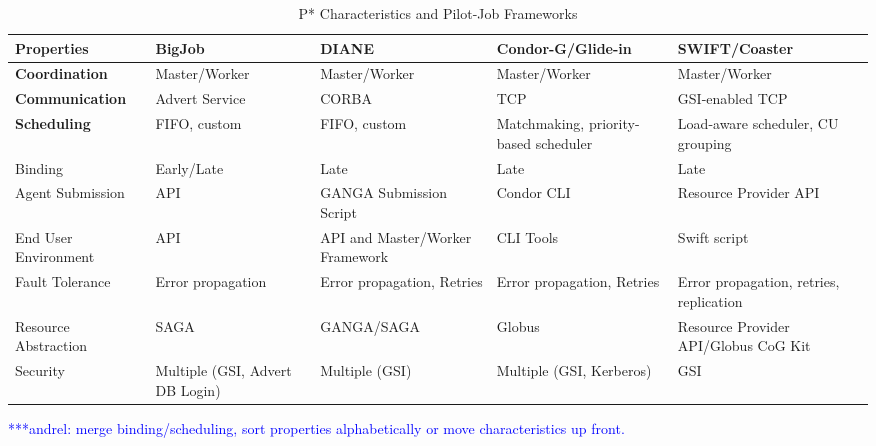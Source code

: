\documentclass[conference,final]{IEEEtran}
\newcommand{\alnote}[1]{ {\textcolor{blue} { ***andrel: #1 }}}
\newcommand{\alnote}[1]{}
\newcommand{\cu}{CU\xspace}
\newcommand{\upp}{\vspace*{-0.5em}}
\begin{document}
\begin{table}[t]
\centering
\begin{tabular}{|l|p{2.5cm}|p{2.5cm}|p{2.5cm}|p{2.5cm}|}
	\hline
	\textbf{Properties}
	&\textbf{BigJob} &\textbf{DIANE} &\textbf{Condor-G/Glide-in} &   
	\textbf{SWIFT/Coaster} \\ \hline

\textbf{Coordination} &Master/Worker  &Master/Worker  &Master/Worker &Master/Worker \\ \hline
	
\textbf{Communication} &Advert Service &CORBA &TCP &GSI-enabled TCP \\ \hline

\textbf{Scheduling} &FIFO, custom &FIFO, custom &Matchmaking, priority-based scheduler 
&Load-aware scheduler, \cu  grouping\\

\hfill Binding &\hfill Early/Late &\hfill Late &\hfill Late &\hfill Late\\


\hline
Agent Submission &API &GANGA Submission Script &Condor CLI 
&Resource Provider API\\

\hline

End User Environment &API &API and Master/Worker Framework &CLI Tools &Swift 
script\\ 

\hline

Fault Tolerance &Error propagation &Error propagation, Retries &Error propagation, Retries &Error propagation, retries, replication\\

\hline

Resource Abstraction &SAGA &GANGA/SAGA &Globus &Resource Provider API/Globus CoG 
Kit \\ 

\hline

Security &Multiple (GSI, Advert DB Login) &Multiple (GSI) &Multiple (GSI, 
Kerberos) &GSI\\ 

\hline


	
\end{tabular}
\caption{P* Characteristics and Pilot-Job Frameworks\upp\upp}
\label{table:pilot-job-comparison}\alnote{merge binding/scheduling, sort 
properties alphabetically or move characteristics up front.}
\end{table}
\end{document}
